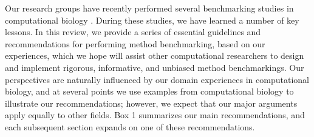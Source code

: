 \documentclass[12pt, a4paper]{article}
\begin{document}
Our research groups have recently performed several benchmarking studies in computational biology \citep{Saelens2018a, Saelens2018b, Duo2018, Soneson2018, Weber2016}. During these studies, we have learned a number of key lessons. In this review, we provide a series of essential guidelines and recommendations for performing method benchmarking, based on our experiences, which we hope will assist other computational researchers to design and implement rigorous, informative, and unbiased method benchmarkings. Our perspectives are naturally influenced by our domain experiences in computational biology, and at several points we use examples from computational biology to illustrate our recommendations; however, we expect that our major arguments apply equally to other fields. Box 1 summarizes our main recommendations, and each subsequent section expands on one of these recommendations.





\vskip 1cm
\end{document}
